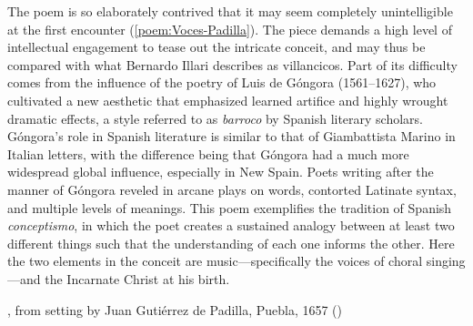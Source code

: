 The poem is so elaborately contrived that it may seem completely unintelligible
at the first encounter (\cref{poem:Voces-Padilla}).%
    \Autocites
    [37--38, 119--132]{Cashner:WLSCM32}
    [133--203]{Cashner:PhD}
The piece demands a high level of intellectual engagement to tease out the
intricate conceit, and may thus be compared with what Bernardo Illari describes
as  villancicos.%
    \Autocite[vol. 2, 304--308]{Illari:Polychoral}
Part of its difficulty comes from the influence of the poetry of Luis de Góngora
(1561--1627), who cultivated a new aesthetic that emphasized learned artifice
and highly wrought dramatic effects, a style referred to as \emph{barroco} by
Spanish literary scholars.%
    \Autocites
    [222--235]{Gaylord:Poetry}
    [vol. 1, 1014--1061]{Valbuena:Literatura}
Góngora's role in Spanish literature is similar to that of Giambattista Marino
in Italian letters, with the difference being that Góngora had a much more
widespread global influence, especially in New Spain.%
    \Autocite{Tenorio:Gongorismo}
Poets writing after the manner of Góngora reveled in arcane plays on words,
contorted Latinate syntax, and multiple levels of meanings.
This poem exemplifies the tradition of Spanish \emph{conceptismo}, in which the
poet creates a sustained analogy between at least two different things such that
the understanding of each one informs the other.
Here the two elements in the conceit are music---specifically the voices of
choral singing---and the Incarnate Christ at his birth.

\begin{poemexample}
    \caption{, from setting by Juan Gutiérrez
    de Padilla, Puebla, 1657 ()}
    
    \label{poem:Voces-Padilla}
   
\end{poemexample}

